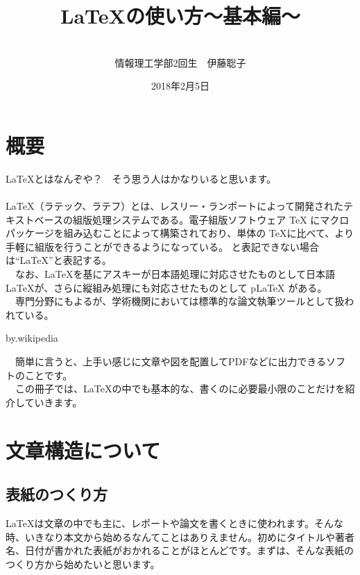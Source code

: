 \documentclass[a4j]{jarticle}
\begin{document}
\begin{titlepage}
\title{\LaTeX の使い方～基本編～}
\author{
\\
情報理工学部2回生　伊藤聡子　
\\
}
\date{2018年2月5日}
\maketitle
\thispagestyle{empty}
\newpage
\end{titlepage}

\tableofcontents
\newpage

\section{概要}
\LaTeX とはなんぞや？　そう思う人はかなりいると思います。\\
\\
  \LaTeX （ラテック、ラテフ）とは、レスリー・ランポートによって開発されたテキストベースの組版処理システムである。電子組版ソフトウェア TeX にマクロパッケージを組み込むことによって構築されており、単体の \TeX に比べて、より手軽に組版を行うことができるようになっている。 と表記できない場合は“\LaTeX ”と表記する。\\
　なお、\LaTeX を基にアスキーが日本語処理に対応させたものとして日本語 \LaTeX が、さらに縦組み処理にも対応させたものとして pLaTeX がある。\\
　専門分野にもよるが、学術機関においては標準的な論文執筆ツールとして扱われている。
\begin{flushright}
 by.wikipedia
\end{flushright}
　簡単に言うと、上手い感じに文章や図を配置してPDFなどに出力できるソフトのことです。\\
　この冊子では、\LaTeX の中でも基本的な、書くのに必要最小限のことだけを紹介していきます。

\section{文章構造について}

\subsection{表紙のつくり方}
\LaTeX は文章の中でも主に、レポートや論文を書くときに使われます。そんな時、いきなり本文から始めるなんてことはありえません。初めにタイトルや著者名、日付が書かれた表紙がおかれることがほとんどです。まずは、そんな表紙のつくり方から始めたいと思います。\\
\end{document}
